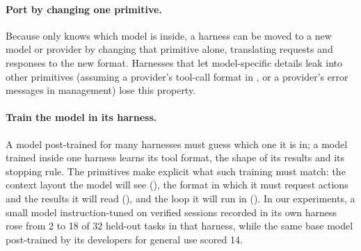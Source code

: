 \paragraph{Port by changing one primitive.} Because only  knows which model is inside, a harness can be moved to a new model or provider by changing that primitive alone, translating requests and responses to the new format. Harnesses that let model-specific details leak into other primitives (assuming a provider's tool-call format in , or a provider's error messages in  management) lose this property.

\paragraph{Train the model in its harness.} A model post-trained for many harnesses must guess which one it is in; a model trained inside one harness learns its tool format, the shape of its results and its stopping rule. The primitives make explicit what such training must match: the context layout the model will see (), the format in which it must request actions and the results it will read (), and the loop it will run in (). In our experiments, a small model instruction-tuned on verified sessions recorded in its own harness rose from 2 to 18 of 32 held-out tasks in that harness, while the same base model post-trained by its developers for general use scored 14.
